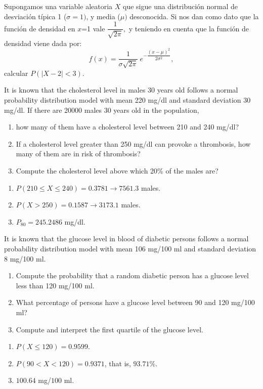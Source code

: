 {Supongamos una variable aleatoria $X$ que sigue una distribución normal de desviación típica 1 ($\sigma =1)$, y media ($\mu )$ desconocida. Si nos dan como dato que la función de densidad en $x$=1 vale $\dfrac{1}{\sqrt{2\pi }},$ y teniendo en cuenta que la función de densidad viene dada por:
\[
f(x)=\dfrac{1}{\sigma \sqrt{2\pi }}\ e^{-\dfrac{(x-\mu )^{2}}{2\sigma ^{2}}},
\]
calcular $P(\left| X-2\right| <3)$.
}
{}
{}


{It is known that the cholesterol level in males 30 years old follows a normal probability distribution model with mean 220 mg/dl and standard deviation 30 mg/dl.
If there are 20000 males 30 years old in the population,
\begin{enumerate}
\item how many of them have a cholesterol level between 210 and 240 mg/dl?
\item If a cholesterol level greater than 250 mg/dl can provoke a thrombosis, how many of them are in risk of thrombosis?
\item Compute the cholesterol level above which 20\% of the males are?
\end{enumerate}
}
{
\begin{enumerate}
\item $P(210\leq X\leq 240)=0.3781\rightarrow 7561.3$ males.
\item $P(X>250)=0.1587\rightarrow 3173.1$ males.
\item $P_{80}=245.2486$ mg/dl.
\end{enumerate}
}
{}


{It is known that the glucose level in blood of diabetic persons follows a normal probability distribution model with
mean 106 mg/100 ml and standard deviation 8 mg/100 ml.
\begin{enumerate}
\item Compute the probability that a random diabetic person has a glucose level less than 120 mg/100 ml.
\item What percentage of persons have a glucose level between 90 and 120 mg/100 ml?
\item Compute and interpret the first quartile of the glucose level.
\end{enumerate}
}
{
\begin{enumerate}
\item $P(X\leq 120)=0.9599$.
\item $P(90< X<120)=0.9371$, that is, $93.71\%$.
\item $100.64$ mg/$100$ ml.
\end{enumerate}
}
{}


